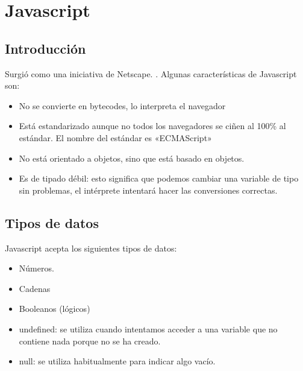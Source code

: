 \documentclass[letterpaper,10pt,spanish]{sphinxmanual}
\begin{document}
\chapter{Javascript}
\label{\detokenize{tema4::doc}}\label{\detokenize{tema4:javascript}}

\section{Introducción}
\label{\detokenize{tema4:introduccion}}
Surgió como una iniciativa de Netscape. . Algunas características de Javascript son:
\begin{itemize}
\item {} 
No se convierte en bytecodes, lo interpreta el navegador

\item {} 
Está estandarizado aunque no todos los navegadores se ciñen al 100\% al estándar. El nombre del estándar es «ECMAScript»

\item {} 
No está orientado a objetos, sino que está basado en objetos.

\item {} 
Es de tipado débil: esto significa que podemos cambiar una variable de tipo sin problemas, el intérprete intentará hacer las conversiones correctas.

\end{itemize}


\section{Tipos de datos}
\label{\detokenize{tema4:tipos-de-datos}}
Javascript acepta los siguientes tipos de datos:
\begin{itemize}
\item {} 
Números.

\item {} 
Cadenas

\item {} 
Booleanos (lógicos)

\item {} 
undefined: se utiliza cuando intentamos acceder a una variable que no contiene nada porque no se ha creado.

\item {} 
null: se utiliza habitualmente para indicar algo vacío.

\end{itemize}
\end{document}
